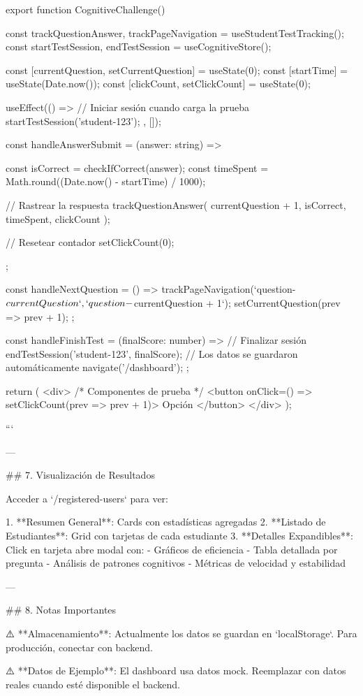 export function CognitiveChallenge() {
  const { trackQuestionAnswer, trackPageNavigation } = useStudentTestTracking();
  const { startTestSession, endTestSession } = useCognitiveStore();
  
  const [currentQuestion, setCurrentQuestion] = useState(0);
  const [startTime] = useState(Date.now());
  const [clickCount, setClickCount] = useState(0);

  useEffect(() => {
    // Iniciar sesión cuando carga la prueba
    startTestSession('student-123');
  }, []);

  const handleAnswerSubmit = (answer: string) => {
    const isCorrect = checkIfCorrect(answer);
    const timeSpent = Math.round((Date.now() - startTime) / 1000);

    // Rastrear la respuesta
    trackQuestionAnswer(
      currentQuestion + 1,
      isCorrect,
      timeSpent,
      clickCount
    );

    // Resetear contador
    setClickCount(0);
  };

  const handleNextQuestion = () => {
    trackPageNavigation(`question-${currentQuestion}`, `question-${currentQuestion + 1}`);
    setCurrentQuestion(prev => prev + 1);
  };

  const handleFinishTest = (finalScore: number) => {
    // Finalizar sesión
    endTestSession('student-123', finalScore);
    // Los datos se guardaron automáticamente
    navigate('/dashboard');
  };

  return (
    <div>
      {/* Componentes de prueba */}
      <button onClick={() => setClickCount(prev => prev + 1)}>
        Opción
      </button>
    </div>
  );
}
```

---

## 7. Visualización de Resultados

Acceder a `/registered-users` para ver:

1. **Resumen General**: Cards con estadísticas agregadas
2. **Listado de Estudiantes**: Grid con tarjetas de cada estudiante
3. **Detalles Expandibles**: Click en tarjeta abre modal con:
   - Gráficos de eficiencia
   - Tabla detallada por pregunta
   - Análisis de patrones cognitivos
   - Métricas de velocidad y estabilidad

---

## 8. Notas Importantes

⚠️ **Almacenamiento**: Actualmente los datos se guardan en `localStorage`. Para producción, conectar con backend.

⚠️ **Datos de Ejemplo**: El dashboard usa datos mock. Reemplazar con datos reales cuando esté disponible el backend.

